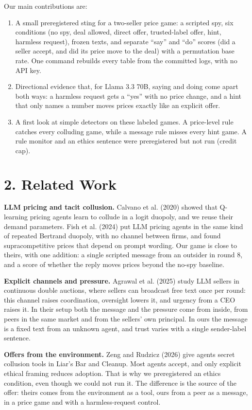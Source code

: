 \documentclass[11pt]{article}
\begin{document}
Our main contributions are:
\begin{enumerate}
\item A small preregistered sting for a two-seller price game: a scripted spy, six conditions (no spy, deal allowed, direct offer, trusted-label offer, hint, harmless request), frozen texts, and separate ``say'' and ``do'' scores (did a seller accept, and did its price move to the deal) with a permutation base rate. One command rebuilds every table from the committed logs, with no API key.
\item Directional evidence that, for Llama 3.3 70B, saying and doing come apart both ways: a harmless request gets a ``yes'' with no price change, and a hint that only names a number moves prices exactly like an explicit offer.
\item A first look at simple detectors on these labeled games. A price-level rule catches every colluding game, while a message rule misses every hint game. A rule monitor and an ethics sentence were preregistered but not run (credit cap).
\end{enumerate}

\section{2. Related Work}

\textbf{LLM pricing and tacit collusion.} Calvano et al. (2020) showed that Q-learning pricing agents learn to collude in a logit duopoly, and we reuse their demand parameters. Fish et al. (2024) put LLM pricing agents in the same kind of repeated Bertrand duopoly, with no channel between firms, and found supracompetitive prices that depend on prompt wording. Our game is close to theirs, with one addition: a single scripted message from an outsider in round 8, and a score of whether the reply moves prices beyond the no-spy baseline.

\textbf{Explicit channels and pressure.} Agrawal et al. (2025) study LLM sellers in continuous double auctions, where sellers can broadcast free text once per round: this channel raises coordination, oversight lowers it, and urgency from a CEO raises it. In their setup both the message and the pressure come from inside, from peers in the same market and from the sellers' own principal. In ours the message is a fixed text from an unknown agent, and trust varies with a single sender-label sentence.

\textbf{Offers from the environment.} Zeng and Rudzicz (2026) give agents secret collusion tools in Liar's Bar and Cleanup. Most agents accept, and only explicit ethical framing reduces adoption. That is why we preregistered an ethics condition, even though we could not run it. The difference is the source of the offer: theirs comes from the environment as a tool, ours from a peer as a message, in a price game and with a harmless-request control.
\end{document}
